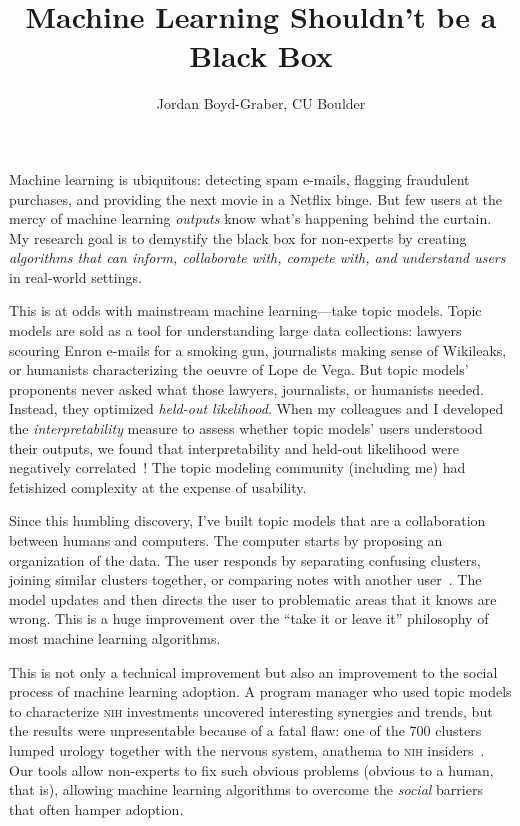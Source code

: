 \documentclass[11pt]{amsart}
\begin{document}
 \title{Machine Learning Shouldn't be a Black Box}

 \author{Jordan Boyd-Graber, CU Boulder}


\maketitle

Machine learning is ubiquitous: detecting spam e-mails, flagging fraudulent
purchases, and providing the next movie in a Netflix binge.  But few users at
the mercy of machine learning \emph{outputs} know what's happening behind the
curtain.  My research goal is to demystify the black box for non-experts by
creating \emph{algorithms that can inform, collaborate with, compete with, and
  understand users} in real-world settings.

This is at odds with mainstream machine learning---take topic models.  Topic
models are sold as a tool for understanding large data collections: lawyers
scouring Enron e-mails for a smoking gun, journalists making sense of Wikileaks,
or humanists characterizing the oeuvre of Lope de Vega.  But topic models'
proponents never asked what those lawyers, journalists, or humanists
needed. Instead, they optimized \emph{held-out likelihood}. When my colleagues
and I developed the \emph{interpretability} measure to assess whether topic
models' users understood their outputs, we found that interpretability and
held-out likelihood were negatively correlated~\cite{chang-09b}! The topic
modeling community (including me) had fetishized complexity at the expense of
usability.

Since this humbling discovery, I've built topic models that are a collaboration
between humans and computers.  The computer starts by proposing an organization
of the data.  The user responds by separating confusing clusters, joining
similar clusters together, or comparing notes with another
user~\cite{hu-14:itm}.  The model updates and then directs the user to
problematic areas that it knows are wrong.  This is a huge improvement over the
``take it or leave it'' philosophy of most machine learning algorithms.

This is not only a technical improvement but also an improvement to the social
process of machine learning adoption. A program manager who used topic models to
characterize \textsc{nih} investments uncovered interesting synergies and
trends, but the results were unpresentable because of a fatal flaw: one of the
700 clusters lumped urology together with the nervous system, anathema to
\textsc{nih} insiders~\cite{talley-11}. Our tools allow non-experts to fix such
obvious problems (obvious to a human, that is), allowing machine learning
algorithms to overcome the \emph{social} barriers that often hamper adoption.
\end{document}
